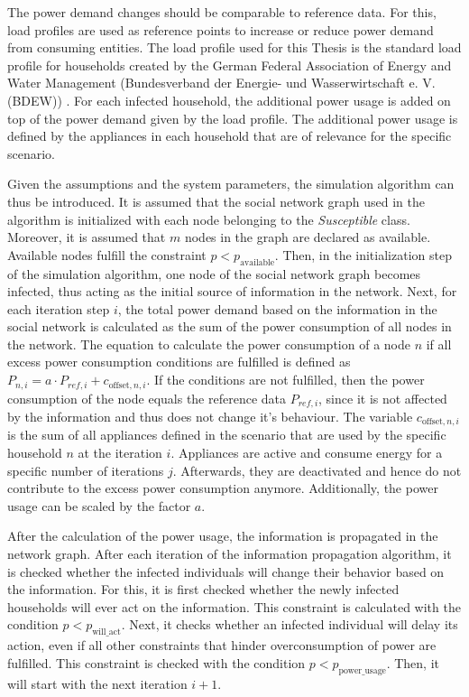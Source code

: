 The power demand changes should be comparable to reference data.
For this, load profiles are used as reference points to increase
or reduce power demand from consuming entities.
The load profile used for this Thesis is the standard load profile
for households created by the German Federal Association of Energy and 
Water Management (Bundesverband der Energie- und Wasserwirtschaft 
e. V. (BDEW)) \cite{meier1999reprasentative}.
For each infected household, the additional power usage is 
added on top of the power demand given by the load profile.
The additional power usage is defined by the appliances in each
household that are of relevance for the specific scenario. 

Given the assumptions and the system parameters, the simulation 
algorithm can thus be introduced. 
It is assumed that the social network graph used in the algorithm
is initialized with each node belonging to the \textit{Susceptible} class.
Moreover, it is assumed that $m$ nodes in the graph are declared
as available. Available nodes fulfill the constraint 
$p < p_{\mathrm{available}}$.
Then, in the initialization step of the simulation algorithm,
one node of the social network graph becomes infected,
thus acting as the initial source of information in the network.
Next, for each iteration step $i$, the total power demand 
based on the information in the social network is calculated 
as the sum of the power consumption of all nodes in the network. 
The equation to calculate the power consumption 
of a node $n$ if all excess power consumption conditions are fulfilled
is defined as 
$P_{n,i}=a \cdot P_{ref, i}+c_{\mathrm{offset}, n, i}$. 
If the conditions are not fulfilled, then the power consumption of the node 
equals the reference data $P_{ref, i}$, since it is 
not affected by the information and thus does not change it's
behaviour.
The variable $c_{\mathrm{offset}, n, i}$
is the sum of all appliances defined in the 
scenario that are used by the 
specific household $n$ at the iteration $i$.
Appliances are active and consume energy 
for a specific number of iterations $j$.
Afterwards, they are deactivated and hence do not contribute to 
the excess power consumption anymore.
Additionally, the power usage can be 
scaled by the factor $a$.

After the calculation of the power usage, the information is 
propagated in the network graph. 
After each iteration of the information propagation algorithm,
it is checked whether the infected individuals will change their behavior
based on the information. For this, it is first checked whether
the newly infected households will ever act on the information.
This constraint is calculated with the condition
$p<p_{\mathrm{will\_act}}$.
Next, it checks whether
an infected individual will delay its action, even if
all other constraints that hinder overconsumption of power
are fulfilled. This constraint is checked with the
condition $p<p_{\mathrm{power\_usage}}$. 
Then, it will start with the next iteration $i+1$.

